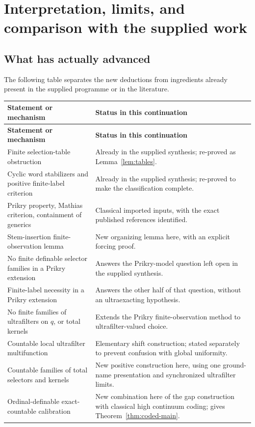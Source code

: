 \documentclass[11pt,letterpaper]{article}
\theoremstyle{definition}
\numberwithin{equation}{section}
\begin{document}
\section{Interpretation, limits, and comparison with the supplied work}\label{sec:scope}

\subsection{What has actually advanced}

The following table separates the new deductions from ingredients already present in the supplied programme or in the literature.

\begingroup\small
\renewcommand{\arraystretch}{1.22}
\begin{longtable}{@{}p{}p{}@{}}
\toprule
\textbf{Statement or mechanism}&\textbf{Status in this continuation}\\\midrule
\endfirsthead
\toprule\textbf{Statement or mechanism}&\textbf{Status in this continuation}\\\midrule
\endhead
Finite selection-table obstruction&Already in the supplied synthesis; re-proved as Lemma~\ref{lem:tables}.\\
Cyclic word stabilizers and positive finite-label criterion&Already in the supplied synthesis; re-proved to make the classification complete.\\
Prikry property, Mathias criterion, containment of generics&Classical imported inputs, with the exact published references identified.\\
Stem-insertion finite-observation lemma&New organizing lemma here, with an explicit forcing proof.\\
No finite definable selector families in a Prikry extension&Answers the Prikry-model question left open in the supplied synthesis.\\
Finite-label necessity in a Prikry extension&Answers the other half of that question, without an ultraexacting hypothesis.\\
No finite families of ultrafilters on $q$, or total kernels&Extends the Prikry finite-observation method to ultrafilter-valued choice.\\
Countable local ultrafilter multifunction&Elementary shift construction; stated separately to prevent confusion with global uniformity.\\
Countable families of total selectors and kernels&New positive construction here, using one ground-name presentation and synchronized ultrafilter limits.\\
Ordinal-definable exact-countable calibration&New combination here of the gap construction with classical high continuum coding; gives Theorem~\ref{thm:coded-main}.\\
\bottomrule
\end{longtable}
\endgroup
\end{document}
